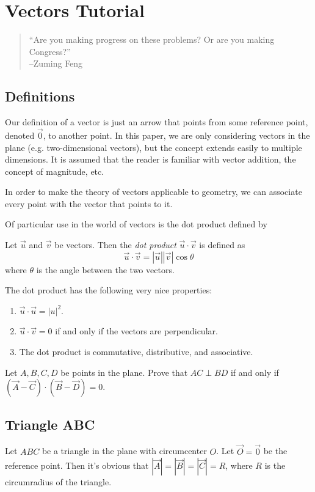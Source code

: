 \chapter{Vectors Tutorial}
\label{appendix:vectors}
\begin{quote}
  ``Are you making progress on these problems? Or are you making Congress?''
  \\ --Zuming Feng
\end{quote}

\section{Definitions}
Our definition of a vector is just an arrow that points from some reference point, denoted $\vec 0$, to another point.  In this paper, we are only considering vectors in the plane (e.g. two-dimensional vectors), but the concept extends easily to multiple dimensions.  It is assumed that the reader is familiar with vector addition, the concept of magnitude, etc.

In order to make the theory of vectors applicable to geometry, we can associate every point with the vector that points to it.

Of particular use in the world of vectors is the dot product defined by
\begin{definition}
  Let $\vec u$ and $\vec v$ be vectors.  Then the \textit{dot product} $\vec u \cdot \vec v$ is defined as
  \[ \vec u \cdot \vec v = |\vec u||\vec v| \cos \theta \]
  where $\theta$ is the angle between the two vectors.
\end{definition}

The dot product has the following very nice properties:
\begin{enumerate}
  \item $\vec u \cdot \vec u = |u|^2$.
  \item $\vec u \cdot \vec v = 0$ if and only if the vectors are perpendicular.
  \item The dot product is commutative, distributive, and associative.
\end{enumerate}

\begin{exercise}
  Let $A,B,C,D$ be points in the plane.  Prove that $AC \perp BD$ if and only if $(\vec A - \vec C) \cdot (\vec B - \vec D) = 0$.
\end{exercise}

\section{Triangle ABC}
Let $ABC$ be a triangle in the plane with circumcenter $O$.  Let $\vec O = \vec 0$ be the reference point.  Then it's obvious that $|\vec A| = |\vec B| = |\vec C| = R$, where $R$ is the circumradius of the triangle.

